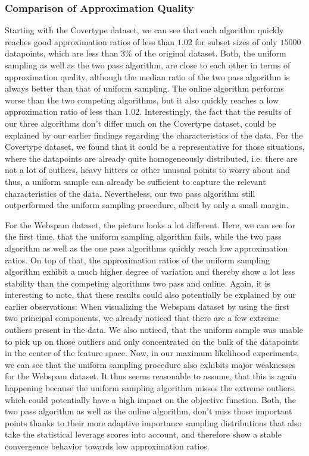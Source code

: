 \subsubsection{Comparison of Approximation Quality}

Starting with the Covertype dataset, we can see that each algorithm
quickly reaches good approximation ratios of less than $1.02$
for subset sizes of only $15000$ datapoints, which are less than
$3\%$ of the original dataset.
Both, the uniform sampling as well as the two pass algorithm, are
close to each other in terms of approximation quality, although
the median ratio of the two pass algorithm is always better than
that of uniform sampling. The online algorithm performs worse than
the two competing algorithms, but it also quickly reaches a low
approximation ratio of less than $1.02$.
Interestingly, the fact that the results of our three algorithms
don't differ much on the Covertype dataset, could
be explained by our earlier
findings regarding the characteristics of the data.
For the Covertype dataset, we found that it could be a representative for
those situations, where the datapoints are already
quite homogeneously distributed, i.e. there
are not a lot of outliers, heavy hitters or other unusual points to worry
about and thus, a uniform sample can already be sufficient to
capture the relevant characteristics of the data.
Nevertheless, our two pass algorithm still outperformed the uniform
sampling procedure, albeit by only a small margin.

For the Webspam dataset, the picture looks a lot different. Here,
we can see for the first time, that the uniform sampling algorithm
fails, while the two pass algorithm as well as the one pass
algorithms quickly reach low approximation ratios. On top of that,
the approximation ratios of the uniform sampling algorithm
exhibit a much higher degree of variation and thereby show a lot
less stability than the competing algorithms two pass and online.
Again, it is interesting to note, that these results could also
potentially be explained by our earlier observations:
When visualizing the Webspam dataset by using the first two
principal components, we already noticed that there are a few
extreme outliers present in the data. We also noticed, that
the uniform sample was unable to pick up on those outliers
and only concentrated on the bulk of the datapoints in
the center of the feature space. Now, in our
maximum likelihood experiments,
we can see that the uniform sampling procedure also
exhibits major weaknesses
for the Webspam dataset. It thus seems reasonable to assume,
that this is again happening because the uniform sampling
algorithm misses the extreme outliers, which could potentially have a
high impact on the objective function.
Both, the two pass algorithm as well as the online algorithm,
don't miss those important points thanks to their more
adaptive importance sampling distributions that also take
the statistical leverage scores into account, and therefore show a
stable convergence behavior towards low approximation ratios.


